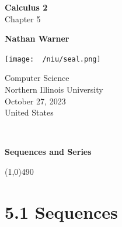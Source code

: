 \documentclass{report}
\title{\Huge{}}
\author{\huge{Nathan Warner}}
\date{\huge{}}
\begin{document}
        \begin{titlepage}
       \begin{center}
           \vspace*{1cm}
    
           \textbf{Calculus 2} \\
           Chapter 5
    
           \vspace{0.5cm}
            
                
           \vspace{1.5cm}
    
           \textbf{Nathan Warner}
    
           \vfill
                
                
           \vspace{0.8cm}
         
           \texttt{[image: ~/niu/seal.png]}
                
           Computer Science \\
           Northern Illinois University\\
           October 27, 2023 \\
           United States\\
           
                
       \end{center}
    \end{titlepage}
    \tableofcontents
    \pagebreak \bigbreak \noindent
    \vspace{2in} \\
    \begin{Huge}
       \textbf{Sequences and Series} 
    \end{Huge}
    \bigbreak \noindent 
    \line(1,0){490}
    \bigbreak \noindent 

    \section*{5.1 Sequences}
    \bigbreak \noindent 
\end{document}
